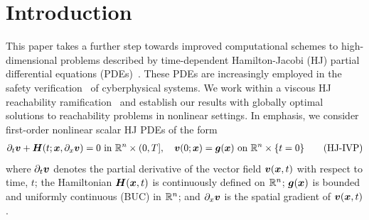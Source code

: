
\section{Introduction}

This paper takes a further step towards improved computational schemes to high-dimensional problems described by time-dependent Hamilton-Jacobi (HJ) partial differential equations (PDEs)~\citet{EvansPDEBook}. These PDEs are increasingly employed in the safety verification~\citet{KerianneHobbs} of cyberphysical systems. We work within a viscous HJ reachability ramification~\citet{LygerosReachability, Mitchell2005, MoluxLevPyCDC, LevelSetTOMS}  and establish our results with globally optimal solutions to reachability problems in nonlinear settings. In emphasis, we consider  first-order nonlinear scalar HJ PDEs of the form %
%
	\begin{align}
		\partial_t\bm{v} + \bm{H}(t; \bm{x}, \partial_x \bm{v}) = 0 \text{   in   } \mathbb{R}^n \times (0, T], \quad 
		\bm{v}(0; \bm{x}) = \bm{g}(\bm{x}) \text{   on   } \mathbb{R}^n \times \{t=0\}
		\tag{HJ-IVP}
		\label{eq:ivp}
	\end{align}
%
where $\partial_t\bm{v}$ denotes the partial derivative of the vector field $\bm{v}(\bm{x},t)$ with respect to time, $t$; the Hamiltonian %
$\bm{H}(\bm{x},t)$ is continuously defined on $\mathbb{R}^n$; $\bm{g}(\bm{x})$ is bounded and uniformly continuous (BUC) in $\mathbb{R}^n$; and $\partial_x \bm{v}$ is the spatial gradient of $\bm{v}(\bm{x},t)$. 

